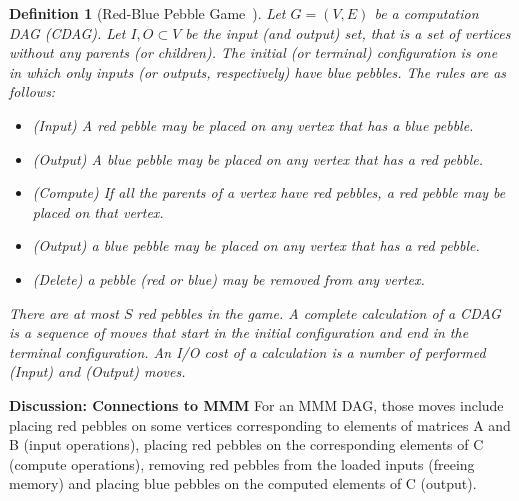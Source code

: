 \documentclass[sigplan,review,anonymous]{acmart}\settopmatter{printfolios=true,printccs=false,printacmref=false}
\newtheorem{defn}{Definition}
\newcommand{\macb}[1]{\textbf{\textsf{#1}}}
\begin{document}
\begin{defn}[Red-Blue Pebble Game~\cite{redblue}]
  \label{df:redbluegame}
  Let $G = (V,E)$ be a computation DAG (CDAG). Let $I, O \subset V$ be the 
  input 
  (and output) set, that is a set of vertices without any parents (or 
  children). The initial (or terminal) configuration is one in which only 
  inputs (or outputs, respectively) have blue pebbles. The rules are as 
  follows:
  \begin{itemize}
    \item (Input) A red pebble may be placed on any vertex that has a blue 
    pebble.
    \item (Output) A blue pebble may be placed on any vertex that has a red 
    pebble.
    \item (Compute) If all the parents of a  vertex have red pebbles, a red 
    pebble may be placed on that vertex.
    \item (Output) a blue pebble may be placed on any vertex that has a red 
    pebble.
    \item (Delete) a pebble (red or blue) may be removed from any vertex.
  \end{itemize}
  There are at most $S$ red pebbles in the game.
  A complete calculation of a CDAG is a sequence of moves that start in the 
  initial configuration and end in the terminal configuration. An \emph{I/O 
  cost} of a calculation is a number of performed (Input) and (Output) moves.
\end{defn}

%
%
 
\macb{Discussion: Connections to MMM}
For an MMM DAG, those moves include placing red pebbles on some vertices
corresponding to elements of matrices A and B (input operations), placing red
pebbles on the corresponding elements of C (compute operations), removing red
pebbles from the loaded inputs (freeing memory) and placing blue pebbles on the
computed elements of C (output). 
\end{document}
